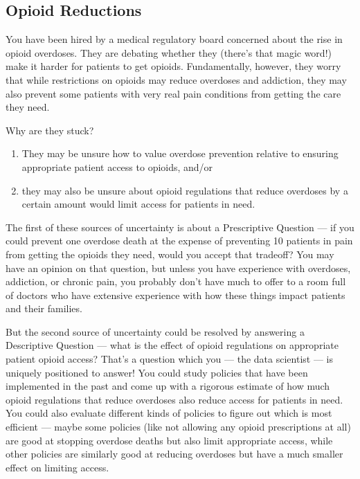 \documentclass[letterpaper,10pt,english]{jupyterBook}
\begin{document}
\subsection{Opioid Reductions}
\label{\detokenize{30_questions/06_descriptive_prescriptive_examples:opioid-reductions}}
\sphinxAtStartPar
You have been hired by a medical regulatory board concerned about the rise in opioid overdoses. They are debating whether they  (there’s that magic word!) make it harder for patients to get opioids. Fundamentally, however, they worry that while restrictions on opioids may reduce overdoses and addiction, they may also prevent some patients with very real pain conditions from getting the care they need.

\sphinxAtStartPar
Why are they stuck?
\begin{enumerate}
%
\item {} 
\sphinxAtStartPar
They may be unsure how to value overdose prevention relative to ensuring appropriate patient access to opioids, and/or

\item {} 
\sphinxAtStartPar
they may also be unsure about  opioid regulations that reduce overdoses by a certain amount would limit access for patients in need.

\end{enumerate}

\sphinxAtStartPar
The first of these sources of uncertainty is about a Prescriptive Question — if you could prevent one overdose death at the expense of preventing 10 patients in pain from getting the opioids they need, would you accept that trade\sphinxhyphen{}off? You may have an opinion on that question, but unless you have experience with overdoses, addiction, or chronic pain, you probably don’t have much to offer to a room full of doctors who have extensive experience with how these things impact patients and their families.

\sphinxAtStartPar
But the second source of uncertainty could be resolved by answering a Descriptive Question — what is the effect of opioid regulations on appropriate patient opioid access? That’s a question which you — the data scientist — is uniquely positioned to answer! You could study policies that have been implemented in the past and come up with a rigorous estimate of how much opioid regulations that reduce overdoses also reduce access for patients in need. You could also evaluate different kinds of policies to figure out which is most efficient — maybe some policies (like not allowing any opioid prescriptions at all) are good at stopping overdose deaths but also  limit appropriate access, while other policies are similarly good at reducing overdoses but have a much smaller effect on limiting access.
\end{document}
